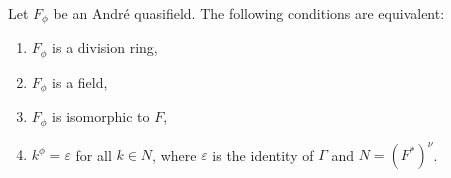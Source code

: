 Let $F_{\phi}$ be an André quasifield. The following conditions are equivalent:

\begin{enumerate}
\item[(i)] $F_{\phi}$ is a division ring,
\item[(ii)] $F_{\phi}$ is a field,
\item[(iii)] $F_{\phi}$ is isomorphic to $F$,
\item[(iv)] $k^{\phi} = \varepsilon$ for all $k \in N$, where $\varepsilon$ is the identity of $\Gamma$ and $N = (F^*)^{\nu}$.
\end{enumerate}
